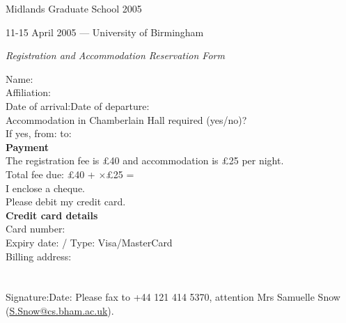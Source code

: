 \documentclass[12pt]{article}
\begin{document}
\begin{center}\Huge
  Midlands Graduate School 2005
\end{center}
\begin{center}\Large
11-15 April 2005 ---
University of Birmingham
\end{center}
\begin{center}\Large\sl
Registration and Accommodation Reservation Form
\end{center}

\vfill
Name:\dotfill\\[4.5ex]
Affiliation:\dotfill\\[4.5ex]
Date of arrival:\dotfill Date of departure:\dotfill\\[4.5ex]
Accommodation in Chamberlain Hall required (yes/no)?\dotfill\\[4.5ex]
If yes, from: \dotfill to:\dotfill\\
\vfill
\textbf{Payment}\\[3ex]
The registration fee is \pounds40 and accommodation is \pounds25 per
night.\\[4.5ex]
Total fee due: \pounds40 +
\framebox{\rule{4mm}{0pt}\rule{0pt}{4mm}} $\times$\pounds25 = \dotfill\\[4.5ex]
\framebox{\rule{4mm}{0pt}\rule{0pt}{4mm}} I enclose a cheque.\\[3ex]
\framebox{\rule{4mm}{0pt}\rule{0pt}{4mm}} Please debit my credit card.\\[4.5ex]
\textbf{Credit card details}\\[3ex]
Card number: \framebox{\rule{4mm}{0pt}\rule{0pt}{4mm}} \framebox{\rule{4mm}{0pt}\rule{0pt}{4mm}} \framebox{\rule{4mm}{0pt}\rule{0pt}{4mm}} \framebox{\rule{4mm}{0pt}\rule{0pt}{4mm}} \hspace{1em}\framebox{\rule{4mm}{0pt}\rule{0pt}{4mm}} \framebox{\rule{4mm}{0pt}\rule{0pt}{4mm}} \framebox{\rule{4mm}{0pt}\rule{0pt}{4mm}} \framebox{\rule{4mm}{0pt}\rule{0pt}{4mm}} \hspace{1em}\framebox{\rule{4mm}{0pt}\rule{0pt}{4mm}} \framebox{\rule{4mm}{0pt}\rule{0pt}{4mm}} \framebox{\rule{4mm}{0pt}\rule{0pt}{4mm}} \framebox{\rule{4mm}{0pt}\rule{0pt}{4mm}} \hspace{1em}\framebox{\rule{4mm}{0pt}\rule{0pt}{4mm}} \framebox{\rule{4mm}{0pt}\rule{0pt}{4mm}} \framebox{\rule{4mm}{0pt}\rule{0pt}{4mm}} \framebox{\rule{4mm}{0pt}\rule{0pt}{4mm}}\\[2ex]
Expiry date:\hspace{2.6mm} \framebox{\rule{4mm}{0pt}\rule{0pt}{4mm}} \framebox{\rule{4mm}{0pt}\rule{0pt}{4mm}} \hspace{.5em}/\hspace{.5em}\framebox{\rule{4mm}{0pt}\rule{0pt}{4mm}} \framebox{\rule{4mm}{0pt}\rule{0pt}{4mm}}\hfill Type: Visa/MasterCard\\[4.5ex]
Billing address:\dotfill\\[4.5ex]
\phantom{Billing address:}\dotfill\\[4.5ex]
\phantom{Billing address:}\dotfill\\[4.5ex]
Signature:\dotfill Date:\dotfill
\vfill
Please fax to +44 121 414 5370, attention Mrs Samuelle Snow (\url{S.Snow@cs.bham.ac.uk}).
\end{document}
